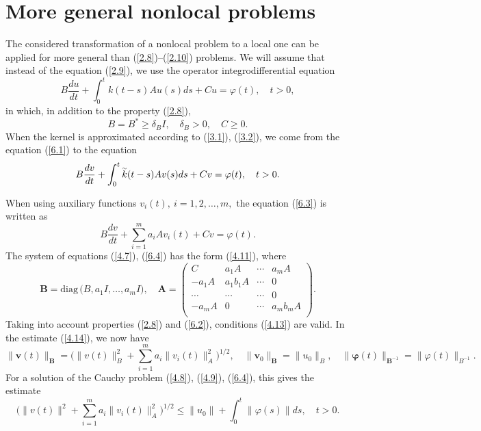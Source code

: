 \documentclass[3p]{elsarticle}
\numberwithin{equation}{section}
\begin{document}
\section{More general nonlocal problems}\label{sec:6} 

The considered transformation of a nonlocal problem to a local one can be applied for more general than (\ref{2.8})--(\ref{2.10}) problems.
We will assume that instead of the equation (\ref{2.9}), we use the operator integrodifferential equation
\begin{equation}\label{6.1}
 B \frac{d u}{d t} + \int_{0}^{t} k(t-s)  A u(s) d s + C u = \varphi (t),
 \quad t > 0 ,  
\end{equation} 
in which, in addition to the property (\ref{2.8}), 
\begin{equation}\label{6.2}
 B = B^* \geq \delta_B I , 
 \quad \delta_B > 0 ,
 \quad C \geq 0 .  
\end{equation} 
When the kernel is approximated according to (\ref{3.1}), (\ref{3.2}), we come from the equation (\ref{6.1}) to the equation
\begin{equation}\label{6.3}
 B \frac{d v}{d t} + \int_{0}^{t} \accentset{\sim }{k}(t-s)  A v(s) d s + C v = \varphi (t),
 \quad t > 0 .  
\end{equation} 

When using auxiliary functions $v_i(t), \ i = 1,2, \ldots, m,$ the equation (\ref{6.3}) is written as
\begin{equation}\label{6.4}
 B \frac{d v}{d t} + \sum_{i=1}^{m} a_i A v_i(t) + C v = \varphi (t) .
\end{equation} 
The system of equations (\ref{4.7}), (\ref{6.4}) has the form (\ref{4.11}), where
\[
 \bm B = \mathrm{diag} \, \big (B, a_1 I, \ldots, a_m I \big),
 \quad \bm A = \left (\begin{array}{cccc}
  C  &  a_1 A & \cdots &  a_m A \\
  - a_1 A  &  a_1 b_1 A & \cdots &  0 \\
  \cdots  & \cdots & \cdots &  0 \\
  - a_m A &  0 & \cdots &  a_m b_m A  \\
\end{array}
 \right ) .
\]
Taking into account properties (\ref{2.8}) and (\ref{6.2}), conditions (\ref{4.13}) are valid.
In the estimate (\ref{4.14}), we now have
\[
 \|\bm v(t)\|_{\bm B} = \Big (\|v(t)\|_B^2 + \sum_{i=1}^{m} a_i \|v_i(t)\|_{A}^2 \Big)^{1/2} , 
 \quad \|\bm v_0\|_{\bm B} = \|u_0\|_B ,
 \quad \|\bm \varphi(t)\|_{\bm B^{-1}} = \|\varphi(t)\|_{B^{-1}} .
\] 
For a solution of the Cauchy problem (\ref{4.8}), (\ref{4.9}), (\ref{6.4}), this gives the estimate
\begin{equation}\label{6.5}
 \Big (\|v(t)\|^2 + \sum_{i=1}^{m} a_i \|v_i(t)\|_{A}^2 \Big)^{1/2} \leq \|u_0\| +  \int_{0}^{t} \|\varphi(s)\| d s ,
 \quad t > 0 .  
\end{equation} 
\end{document}
